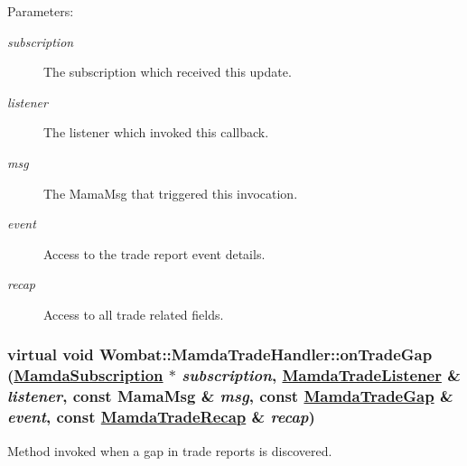 \begin{Desc}
\item[Parameters:]
\begin{description}
\item[{\em subscription}]The subscription which received this update. \item[{\em listener}]The listener which invoked this callback. \item[{\em msg}]The Mama\-Msg that triggered this invocation. \item[{\em event}]Access to the trade report event details. \item[{\em recap}]Access to all trade related fields. \end{description}
\end{Desc}
\hypertarget{classWombat_1_1MamdaTradeHandler_ba0b748342b02c74f6cc52c9f53426f1}{
\subsubsection[onTradeGap]{\setlength{\rightskip}{0pt plus 5cm}virtual void Wombat::Mamda\-Trade\-Handler::on\-Trade\-Gap (\hyperlink{classWombat_1_1MamdaSubscription}{Mamda\-Subscription} $\ast$ {\em subscription}, \hyperlink{classWombat_1_1MamdaTradeListener}{Mamda\-Trade\-Listener} \& {\em listener}, const Mama\-Msg \& {\em msg}, const \hyperlink{classWombat_1_1MamdaTradeGap}{Mamda\-Trade\-Gap} \& {\em event}, const \hyperlink{classWombat_1_1MamdaTradeRecap}{Mamda\-Trade\-Recap} \& {\em recap})}}
\label{classWombat_1_1MamdaTradeHandler_ba0b748342b02c74f6cc52c9f53426f1}


Method invoked when a gap in trade reports is discovered. 

